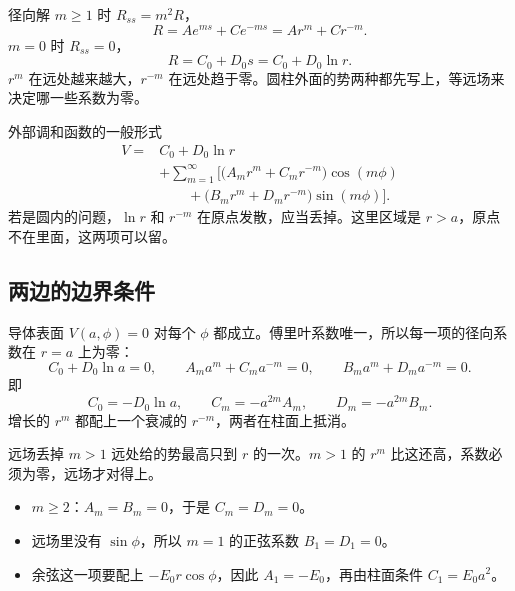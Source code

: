 \documentclass[fontset=windows, chinese, 10pt, xcolor=dvipsnames]{beamer}
\begin{document}
\begin{frame}{径向解}
  $m\geq 1$ 时 $R_{ss}=m^2 R$，
  \begin{equation*}
    R=A e^{ms}+C e^{-ms}=A r^{m}+C r^{-m}.
  \end{equation*}
  $m=0$ 时 $R_{ss}=0$，
  \begin{equation*}
    R=C_0+D_0 s=C_0+D_0\ln r.
  \end{equation*}
  $r^{m}$ 在远处越来越大，$r^{-m}$ 在远处趋于零。圆柱外面的势两种都先写上，等远场来决定哪一些系数为零。
\end{frame}

\begin{frame}{外部调和函数的一般形式}
  \begin{equation*}
    \begin{aligned}
    V={}&C_0+D_0\ln r\\
    &+\sum_{m=1}^{\infty}\Big[
      \bigl(A_m r^{m}+C_m r^{-m}\bigr)\cos(m\phi)\\
      &\qquad
      +\bigl(B_m r^{m}+D_m r^{-m}\bigr)\sin(m\phi)
    \Big].
    \end{aligned}
  \end{equation*}
  若是圆内的问题，$\ln r$ 和 $r^{-m}$ 在原点发散，应当丢掉。这里区域是 $r>a$，原点不在里面，这两项可以留。
\end{frame}

\subsection{两边的边界条件}

\begin{frame}{导体表面}
  $V(a,\phi)=0$ 对每个 $\phi$ 都成立。傅里叶系数唯一，所以每一项的径向系数在 $r=a$ 上为零：
  \begin{equation*}
    C_0+D_0\ln a=0,
    \qquad
    A_m a^{m}+C_m a^{-m}=0,
    \qquad
    B_m a^{m}+D_m a^{-m}=0.
  \end{equation*}
  即
  \begin{equation*}
    C_0=-D_0\ln a,
    \qquad
    C_m=-a^{2m}A_m,
    \qquad
    D_m=-a^{2m}B_m.
  \end{equation*}
  增长的 $r^{m}$ 都配上一个衰减的 $r^{-m}$，两者在柱面上抵消。
\end{frame}

\begin{frame}{远场丢掉 $m>1$}
  远处给的势最高只到 $r$ 的一次。$m>1$ 的 $r^{m}$ 比这还高，系数必须为零，远场才对得上。
  \begin{itemize}
    \item $m\geq 2$：$A_m=B_m=0$，于是 $C_m=D_m=0$。
    \item 远场里没有 $\sin\phi$，所以 $m=1$ 的正弦系数 $B_1=D_1=0$。
    \item 余弦这一项要配上 $-E_0 r\cos\phi$，因此 $A_1=-E_0$，再由柱面条件 $C_1=E_0 a^2$。
  \end{itemize}
\end{frame}
\end{document}
